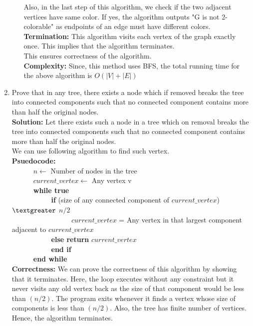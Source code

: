 \documentclass[12pt]{article}
\begin{document}
\begin{enumerate}
\begin{enumerate}
Also, in the last step of this algorithm, we check if the two adjacent vertices have same color. If yes, the algorithm outputs "G is not 2-colorable" as endpoints of an edge must have different colors.\\ 
\textbf{Termination:} This algorithm visits each vertex of the graph exactly once. This implies that the algorithm terminates.\\
This ensures correctness of the algorithm.\\
\textbf{Complexity:} Since, this method uses BFS, the total running time for the above algorithm is  $O(|V| + |E|)$\\
\end{enumerate}
\pagebreak
\item Prove that in any tree, there exists a node which if removed breaks the tree into connected components such that no connected component contains more than half the original nodes. \\
\textbf{Solution:}  Let there exists such a node in a tree which on removal breaks the tree into connected components such that no connected component contains more than half the original nodes. \\
We can use following algorithm to find such vertex.\\
\textbf{Psuedocode:}\\
\verb|		|$n \leftarrow $ Number of nodes in the tree\\ 
\verb|		|$current\_vertex \leftarrow$ Any vertex v\\
\verb|		|\textbf{while true}\\
\verb|		|\verb|		|\textbf{if} (size of any connected component of $current\_vertex$) $ \textgreater$ $n/2$\\
\verb|		|\verb|		|\verb|		| $current\_vertex$ = Any vertex in that largest component  adjacent to $current\_vertex$\\
\verb|		|\verb|		|\textbf{else return} $current\_vertex$\\  
\verb|		|\verb|		|\textbf{end if}\\
\verb|		|\textbf{end while}\\
\textbf{Correctness:} We can prove the correctness of this algorithm by showing that it terminates. Here, the loop executes without any constraint but it never visits any old vertex back as the size of that component would be less than $(n/2)$.  The program exits whenever it finds a vertex whose size of components is less than $(n/2)$. Also, the tree has finite number of vertices. Hence, the algorithm terminates.\\ 

\end{enumerate}
\end{document}
